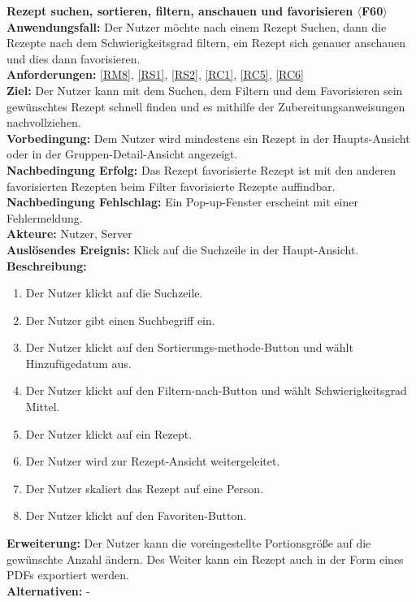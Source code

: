 \documentclass[parskip=full]{scrartcl}
\begin{document}
\textbf{Rezept suchen, sortieren, filtern, anschauen und favorisieren $\langle$F60$\rangle$}\\
\textbf{Anwendungsfall:} Der Nutzer möchte nach einem Rezept Suchen, dann die Rezepte nach dem Schwierigkeitsgrad filtern, ein Rezept sich genauer anschauen und dies dann favorisieren.\\
\textbf{Anforderungen:} \ref{RM8}, \ref{RS1}, \ref{RS2}, \ref{RC1}, \ref{RC5}, \ref{RC6}\\
\textbf{Ziel:} Der Nutzer kann mit dem Suchen, dem Filtern und dem Favorisieren sein gewünschtes Rezept schnell finden und es mithilfe der Zubereitungsanweisungen nachvollziehen.\\
\textbf{Vorbedingung:} Dem Nutzer wird mindestens ein Rezept in der Haupts-Ansicht oder in der Gruppen-Detail-Ansicht angezeigt.\\
\textbf{Nachbedingung Erfolg:} Das Rezept favorisierte Rezept ist mit den anderen favorisierten Rezepten beim Filter favorisierte Rezepte auffindbar.\\
\textbf{Nachbedingung Fehlschlag:} Ein Pop-up-Fenster erscheint mit einer Fehlermeldung.\\
\textbf{Akteure:} Nutzer, Server\\
\textbf{Auslösendes Ereignis:} Klick auf die Suchzeile in der Haupt-Ansicht.\\
\textbf{Beschreibung:}
\begin{enumerate}
    \item Der Nutzer klickt auf die Suchzeile.
    \item Der Nutzer gibt einen Suchbegriff ein.
    \item Der Nutzer klickt auf den Sortierungs-methode-Button und wählt Hinzufügedatum aus.
    \item Der Nutzer klickt auf den Filtern-nach-Button und wählt Schwierigkeitsgrad Mittel.
    \item Der Nutzer klickt auf ein Rezept.
    \item Der Nutzer wird zur Rezept-Ansicht weitergeleitet.
    \item Der Nutzer skaliert das Rezept auf eine Person.
    \item Der Nutzer klickt auf den Favoriten-Button.
\end{enumerate}
\textbf{Erweiterung:} Der Nutzer kann die voreingestellte Portionsgröße auf die gewünschte Anzahl ändern. Des Weiter kann ein Rezept auch in der Form eines PDFs exportiert werden.\\
\textbf{Alternativen:} -
\newpage
\end{document}
